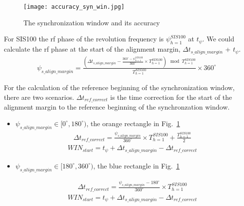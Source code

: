 \begin{figure}[!htb]
   \centering   
   \texttt{[image: accuracy\_syn\_win.jpg]}
   \caption{The synchronization window and its accuracy}
   \label{accuracy_syn_win}
\end{figure}

For SIS100 the rf phase of the revolution frequency is $\psi_{h=1}^{SIS100}$ at $t_{\psi}$. We could calculate the rf phase at the start of the alignment margin, $\Delta t_{s\_ align \_ margin}$ + $t_{\psi}$.
\begin{equation}
\begin{aligned}
\psi_{s\_ align \_ margin}=\frac{(\Delta t_{s\_ align \_ margin}- \frac{360^\circ-\psi_{h=1}^{SIS100}}{360^\circ} \times {T_{h=1}^{SIS100}}) \mod T_{h=1}^{SIS100}}{T_{h=1}^{SIS100}}\times {360^\circ} 
\label{phase_after_syn}
\end{aligned}
\end{equation}

For the calculation of the reference beginning of the synchronization window, there are two scenarios. $\Delta t_{ref \_ correct}$ is the time correction for the start of the alignment margin to the reference beginning of the synchronzation window.
\begin{itemize}
\item $\psi_{s\_ align \_ margin}\in [0^\circ,180^\circ)$, the orange rectangle in Fig.~\ref{accuracy_syn_win}
\begin{equation}
\begin{aligned}
\Delta t_{ref \_ correct}=\frac{\psi_{s\_ align \_ margin}}{360^\circ}\times T_{h=1}^{SIS100}+\frac{T_{h=1}^{SIS100}}{2}
\end{aligned}
\end{equation}
\begin{equation}
\begin{aligned}
WIN_{start}=t_{\psi}+\Delta t_{s\_ align \_ margin}-\Delta t_{ref \_ correct}
\end{aligned}
\end{equation}


\item $\psi_{s\_ align \_ margin}\in [180^\circ,360^\circ)$, the blue rectangle in Fig.~\ref{accuracy_syn_win}

\begin{equation}
\begin{aligned}
\Delta t_{ref \_ correct}=\frac{\psi_{s\_ align \_ margin}-180^\circ}{360^\circ}\times T_{h=1}^{SIS100}
\end{aligned}
\end{equation}
\begin{equation}
\begin{aligned}
WIN_{start}=t_{\psi}+\Delta t_{s\_ align \_ margin}-\Delta t_{ref \_ correct}
\end{aligned}
\end{equation}

\end{itemize}

